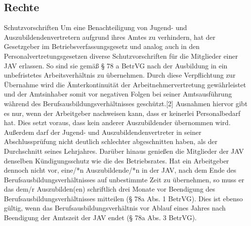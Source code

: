 \subsection{Rechte}
{
Schutzvorschriften
Um eine Benachteiligung von Jugend- und Auszubildendenvertretern aufgrund ihres Amtes zu verhindern, hat der Gesetzgeber im Betriebsverfassungsgesetz und analog auch in den Personalvertretungsgesetzen diverse Schutzvorschriften für die Mitglieder einer JAV erlassen. So sind sie gemäß § 78 a BetrVG nach der Ausbildung in ein unbefristetes Arbeitsverhältnis zu übernehmen. Durch diese Verpflichtung zur Übernahme wird die Ämterkontinuität der Arbeitnehmervertretung gewährleistet und der Amtsinhaber somit vor negativen Folgen bei seiner Amtsausführung während des Berufsausbildungsverhältnisses geschützt.[2] Ausnahmen hiervor gibt es nur, wenn der Arbeitgeber nachweisen kann, dass er keinerlei Personalbedarf hat. Dies setzt voraus, dass kein anderer Auszubildender übernommen wird. Außerdem darf der Jugend- und Auszubildendenvertreter in seiner Abschlussprüfung nicht deutlich schlechter abgeschnitten haben, als der Durchschnitt seines Lehrjahres. Darüber hinaus genießen die Mitglieder der JAV denselben Kündigungsschutz wie die des Betriebsrates. Hat ein Arbeitgeber dennoch nicht vor, eine/*n Auszubildende/*n in der JAV, nach dem Ende des Berufsausbildungsverhältnisses auf unbestimmte Zeit zu übernehmen, so muss er das dem/r Auszubilden(en) schriftlich drei Monate vor Beendigung des Berufsausbildungsverhältnisses mitteilen (§ 78a Abs. 1 BetrVG). Dies ist ebenso gültig, wenn das Berufsausbildungsverhältnis vor Ablauf eines Jahres nach Beendigung der Amtszeit der JAV endet (§ 78a Abs. 3 BetrVG).
}
